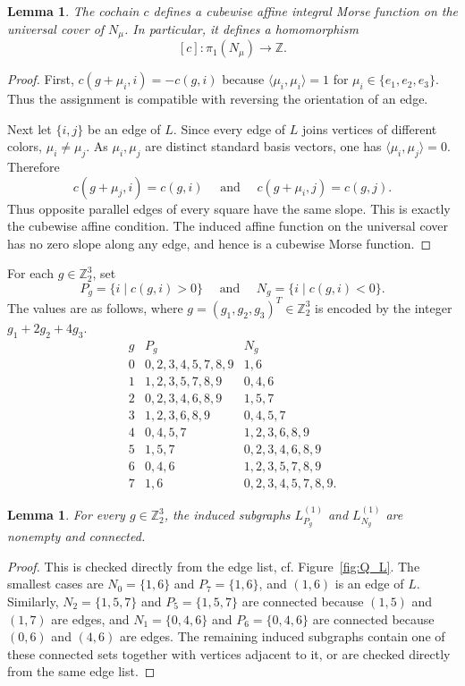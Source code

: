 \documentclass{amsart}
\newtheorem{lemma}[theorem]{Lemma}
\numberwithin{equation}{section}
\theoremstyle{definition}
\theoremstyle{remark}
\newcommand{\Z}{\mathbb Z}
\begin{document}
\begin{lemma} \label{lem:q10-affine-cocycle}
    The cochain $c$ defines a cubewise affine integral Morse function on the universal cover of $N_\mu$.  
    In particular, it defines a homomorphism 
    $$
        [c] \colon \pi_1(N_\mu)\to \Z.
    $$
\end{lemma}
\begin{proof}
    First, $c(g+\mu_i,i)=-c(g,i)$ because $\langle \mu_i,\mu_i\rangle=1$ for $\mu_i\in\{e_1,e_2,e_3\}$.
    Thus the assignment is compatible with reversing the orientation of an edge.
    
    Next let $\{i,j\}$ be an edge of $L$.  
    Since every edge of $L$ joins vertices of different colors, $\mu_i\neq\mu_j$.  
    As $\mu_i,\mu_j$ are distinct standard basis vectors, one has $\langle \mu_i,\mu_j\rangle=0$.
    Therefore 
    $$
            c(g+\mu_j,i)=c(g,i) \quad \text{ and } \quad c(g+\mu_i,j)=c(g,j).
    $$
    Thus opposite parallel edges of every square have the same slope.  
    This is exactly the cubewise affine condition.  
    The induced affine function on the universal cover has no zero slope along any edge, and hence is a cubewise Morse function.
\end{proof}

For each $g\in\Z_2^3$, set
$$
    P_g=\{i\mid c(g,i)>0\} \quad \text{ and } \quad N_g=\{i\mid c(g,i)<0\}.
$$
The values are as follows, where $g = (g_1, g_2, g_3)^T \in \Z_2^3$ is encoded by the integer $g_1+2g_2+4g_3$.
$$
    \begin{array}{c|l|l}
         g & P_g & N_g\\
        \hline
        0 & 0,2,3,4,5,7,8,9 & 1,6\\
        1 & 1,2,3,5,7,8,9 & 0,4,6\\
        2 & 0,2,3,4,6,8,9 & 1,5,7\\
        3 & 1,2,3,6,8,9 & 0,4,5,7\\
        4 & 0,4,5,7 & 1,2,3,6,8,9\\
        5 & 1,5,7 & 0,2,3,4,6,8,9\\
        6 & 0,4,6 & 1,2,3,5,7,8,9\\
        7 & 1,6 & 0,2,3,4,5,7,8,9.
    \end{array}
$$

\begin{lemma}\label{lem:q10-connected-links}
    For every $g\in\Z_2^3$, the induced subgraphs $L_{P_g}^{(1)}$ and $L_{N_g}^{(1)}$ are nonempty and connected.
\end{lemma}
\begin{proof}
    This is checked directly from the edge list, cf. Figure~\ref{fig:Q_L}.  
    The smallest cases are $N_0=\{1,6\}$ and $P_7=\{1,6\}$, and $(1,6)$ is an edge of $L$.  
    Similarly, $N_2=\{1,5,7\}$ and $P_5=\{1,5,7\}$ are connected because $(1,5)$ and $(1,7)$ are edges, and $N_1=\{0,4,6\}$ and $P_6=\{0,4,6\}$ are connected because $(0,6)$ and $(4,6)$ are edges.  
    The remaining induced subgraphs contain one of these connected sets together with vertices adjacent to it, or are checked directly from the same edge list.
\end{proof}
\end{document}
